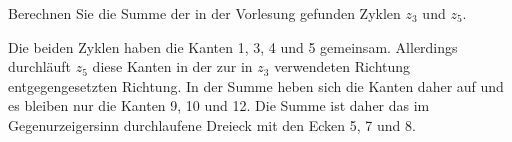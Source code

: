 Berechnen Sie die Summe der in der Vorlesung gefunden Zyklen
$z_3$ und $z_5$.

\begin{loesung}
Die beiden Zyklen haben die Kanten 1, 3, 4 und 5 gemeinsam.
Allerdings durchläuft $z_5$ diese Kanten in der zur in $z_3$ verwendeten
Richtung entgegengesetzten Richtung.
In der Summe heben sich die Kanten daher auf und es bleiben nur
die Kanten 9, 10 und 12.
Die Summe ist daher das im Gegenurzeigersinn durchlaufene Dreieck 
mit den Ecken 5, 7 und 8.
\end{loesung}
